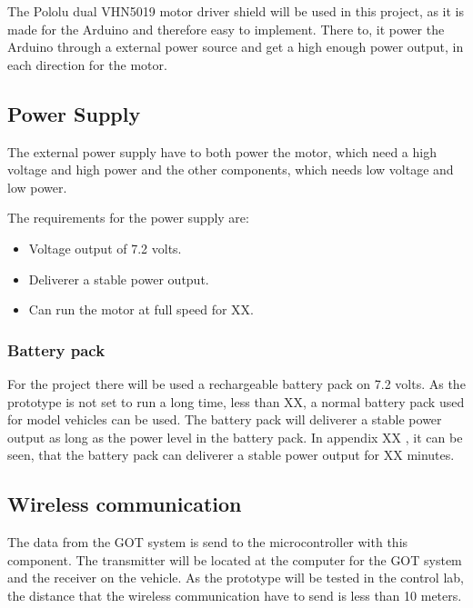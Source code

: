 The Pololu dual VHN5019 motor driver shield will be used in this project, as it is made for the Arduino and therefore easy to implement. There to, it power the Arduino through a external power source and get a high enough power output, in each direction for the motor.




\subsection{Power Supply}
The external power supply have to both power the motor, which need a high voltage and high power and the other components, which needs low voltage and low power.

The requirements for the power supply are:
\begin{itemize}
\item Voltage output of 7.2 volts.
\item Deliverer a stable power output.
\item Can run the motor at full speed for XX. 
\end{itemize}

\subsubsection{Battery pack}
For the project there will be used a rechargeable battery pack on 7.2 volts. As the prototype is not set to run a long time, less than XX, a normal battery pack used for model vehicles can be used. The battery pack will deliverer a stable power output as long as the power level in the battery pack. In appendix XX , it can be seen, that the battery pack can deliverer a stable power output for XX minutes.


\subsection{Wireless communication}
The data from the GOT system is send to the microcontroller with this component. The transmitter will be located at the computer for the GOT system and the receiver on the vehicle. As the prototype will be tested in the control lab, the distance that the wireless communication have to send is less than 10 meters.

